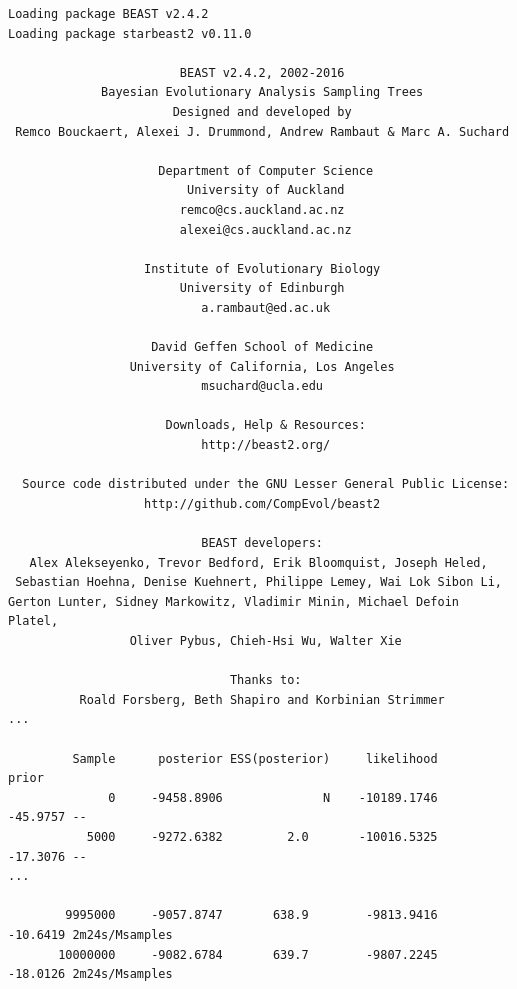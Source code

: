 \documentclass{article}
\begin{document}
{\scriptsize
\begin{verbatim}
Loading package BEAST v2.4.2
Loading package starbeast2 v0.11.0

                        BEAST v2.4.2, 2002-2016
             Bayesian Evolutionary Analysis Sampling Trees
                       Designed and developed by
 Remco Bouckaert, Alexei J. Drummond, Andrew Rambaut & Marc A. Suchard
                                    
                     Department of Computer Science
                         University of Auckland
                        remco@cs.auckland.ac.nz
                        alexei@cs.auckland.ac.nz
                                    
                   Institute of Evolutionary Biology
                        University of Edinburgh
                           a.rambaut@ed.ac.uk
                                    
                    David Geffen School of Medicine
                 University of California, Los Angeles
                           msuchard@ucla.edu
                                    
                      Downloads, Help & Resources:
                           http://beast2.org/
                                    
  Source code distributed under the GNU Lesser General Public License:
                   http://github.com/CompEvol/beast2
                                    
                           BEAST developers:
   Alex Alekseyenko, Trevor Bedford, Erik Bloomquist, Joseph Heled, 
 Sebastian Hoehna, Denise Kuehnert, Philippe Lemey, Wai Lok Sibon Li, 
Gerton Lunter, Sidney Markowitz, Vladimir Minin, Michael Defoin Platel, 
                 Oliver Pybus, Chieh-Hsi Wu, Walter Xie
                                    
                               Thanks to:
          Roald Forsberg, Beth Shapiro and Korbinian Strimmer
...

         Sample      posterior ESS(posterior)     likelihood          prior
              0     -9458.8906              N    -10189.1746       -45.9757 --
           5000     -9272.6382         2.0       -10016.5325       -17.3076 --
...

        9995000     -9057.8747       638.9        -9813.9416       -10.6419 2m24s/Msamples
       10000000     -9082.6784       639.7        -9807.2245       -18.0126 2m24s/Msamples


\end{verbatim}}
\end{document}
